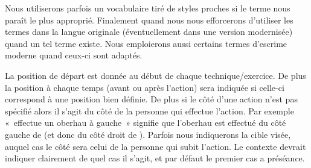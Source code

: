 Nous utiliserons parfois un vocabulaire tiré de styles proches si le terme nous paraît le plus approprié.
Finalement quand nous nous efforcerons d'utiliser les termes dans la langue originale (éventuellement dans une version modernisée) quand un tel terme existe.
Nous emploierons aussi certains termes d'escrime moderne quand ceux-ci sont adaptés.

La position de départ est donnée au début de chaque technique/exercice.
De plus la position à chaque temps (avant ou après l'action) sera indiquée si celle-ci correspond à une position bien définie.
De plus si le côté d'une action n'est pas spécifié alors il s'agit du côté de la personne qui effectue l'action.
Par exemple « \A effectue un oberhau à gauche » signifie que l'oberhau est effectué du côté gauche de \A (et donc du côté droit de \D).
Parfois nous indiquerons la cible visée, auquel cas le côté sera celui de la personne qui subit l'action.
Le contexte devrait indiquer clairement de quel cas il s'agit, et par défaut le premier cas a préséance.

% 
